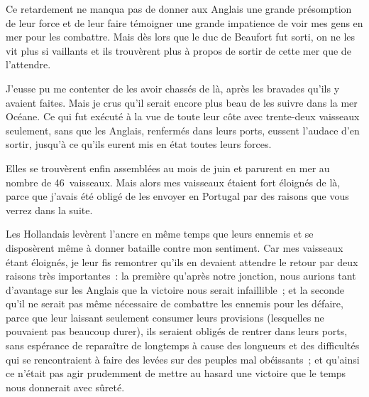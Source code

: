 \documentclass[french,twoside]{book} %
\begin{document}
Ce retardement ne manqua pas de donner aux Anglais une grande présomption de leur force et de leur faire témoigner une grande impatience de voir mes gens en mer pour les combattre. Mais dès lors que le duc de Beaufort fut sorti, on ne les vit plus si vaillants et ils trouvèrent plus à propos de sortir de cette mer que de l’attendre.\par
J’eusse pu me contenter de les avoir chassés de là, après les bravades qu’ils y avaient faites. Mais je crus qu’il serait encore plus beau de les suivre dans la mer Océane. Ce qui fut exécuté à la vue de toute leur côte avec trente-deux vaisseaux seulement, sans que les Anglais, renfermés dans leurs ports, eussent l’audace d’en sortir, jusqu’à ce qu’ils eurent mis en état toutes leurs forces.\par
Elles se trouvèrent enfin assemblées au mois de juin et parurent en mer au nombre de 46 vaisseaux. Mais alors mes vaisseaux étaient fort éloignés de là, parce que j’avais été obligé de les envoyer en Portugal par des raisons que vous verrez dans la suite.\par
Les Hollandais levèrent l’ancre en même temps que leurs ennemis et se disposèrent même à donner bataille contre mon sentiment. Car mes vaisseaux étant éloignés, je leur fis remontrer qu’ils en devaient attendre le retour par deux raisons très importantes : la première qu’après notre jonction, nous aurions tant d’avantage sur les Anglais que la victoire nous serait infaillible ; et la seconde qu’il ne serait pas même nécessaire de combattre les ennemis pour les défaire, parce que leur laissant seulement consumer leurs provisions (lesquelles ne pouvaient pas beaucoup durer), ils seraient obligés de rentrer dans leurs ports, sans espérance de reparaître de longtemps à cause des longueurs et des difficultés qui se rencontraient à faire des levées sur des peuples mal obéissants ; et qu’ainsi ce n’était pas agir prudemment de mettre au hasard une victoire que le temps nous donnerait avec sûreté.\par
\end{document}

